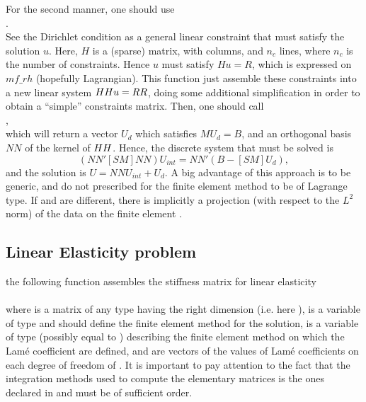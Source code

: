 \documentclass[11pt,a4paper]{article}
\begin{document}
For the second manner, one should use\\[0.5cm]
.\\[0.5cm]
See the Dirichlet condition as a general linear constraint that must
satisfy the solution $u$. Here, $H$ is a (sparse) matrix, with  columns, and $n_c$ lines, where $n_c$ is the number
of constraints. Hence $u$ must satisfy $Hu=R$, which is expressed on
$mf\_rh$ (hopefully Lagrangian). This function just assemble these
constraints into a new linear system $HH u=RR$, doing some
additional simplification in order to obtain a ``simple'' constraints
matrix.   Then, one should
call \\[0.5cm],\\[0.5cm] which will return a vector $U_d$ which
satisfies $MU_d=B$, and an orthogonal basis $NN$ of the kernel of
$HH$. Hence, the discrete system that must be solved is
\begin{equation*} (NN'[SM]NN) U_{int}=NN'(B-[SM]U_d),\end{equation*}
and the solution is $U=NN U_{int}+U_d$.
A big advantage of this approach is to be generic, and do not prescribed for the finite element method  to be of Lagrange type. If  and 
 are different, there is implicitly a projection (with respect to the $L^2$ norm) of the data on the finite element .

\subsection{Linear Elasticity problem}

the following function assembles the stiffness matrix for linear elasticity\\[0.5cm]
 \\[0.5cm]
where  is a matrix of any type having the right dimension (i.e. here ),  is a variable of type  and should define the finite element method for the solution,   is a variable of type  (possibly equal to ) describing the finite element method on which the Lam{\'e} coefficient are defined,  and  are vectors of the values of Lam{\'e} coefficients on each degree of freedom of . It is important to pay attention to the fact that the integration methods used to compute the elementary matrices is the ones declared in  and must be of sufficient order.\\[0.5cm]
\end{document}
